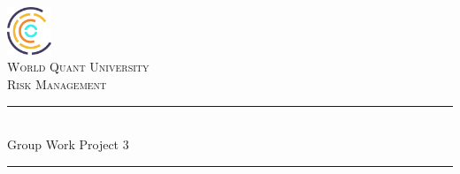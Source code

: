 

\begin{titlepage}

\newcommand{\HRule}{\rule{\linewidth}{0.5mm}} %

\center %
 

\includegraphics[width=50px, keepaspectratio]{wqu.png}\\[1cm] %

\textsc{\LARGE World Quant University}\\[1.5cm] %
\textsc{\Large Risk Management}\\[0.5cm] %


\HRule \\[0.4cm]
{ \huge Group Work Project 3}\\[0.4cm] %
\HRule \\[1.5cm]
 


\end{titlepage}
